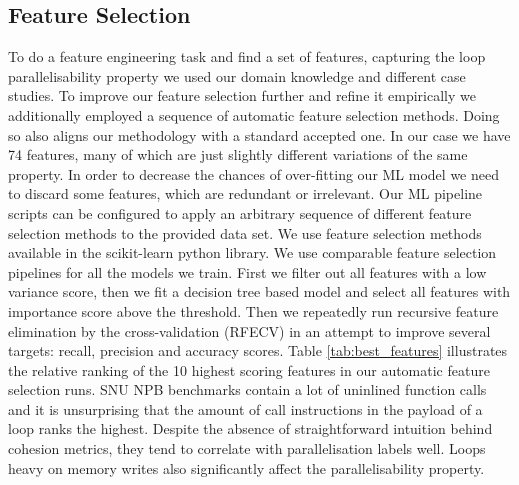 \documentclass[sigconf,10pt,review,anonymous]{acmart}
\begin{document}
\subsection{Feature Selection}
\label{feature_selection}
\quad To do a feature engineering task and find a set of features, capturing the loop parallelisability property we used our domain knowledge and different case studies. To improve our feature selection further and refine it empirically we additionally employed a sequence of automatic feature selection methods. Doing so also aligns our methodology with a standard accepted one.\newline\null
\quad In our case we have 74 features, many of which are just slightly different variations of the same property. In order to decrease the chances of over-fitting our ML model we need to discard some features, which are redundant or irrelevant.\newline\null
\quad Our ML pipeline scripts can be configured to apply an arbitrary sequence of different feature selection methods to the provided data set. We use feature selection methods available in the scikit-learn python library. We use comparable feature selection pipelines for all the models we train. First we filter out all features with a low variance score, then we fit a decision tree based model and select all features with importance score above the threshold. Then we repeatedly run recursive feature elimination by the cross-validation (RFECV) in an attempt to improve several targets: recall, precision and accuracy scores. Table \ref{tab:best_features} illustrates the relative ranking of the 10 highest scoring features in our automatic feature selection runs.\newline\null  
\quad SNU NPB benchmarks contain a lot of uninlined function calls and it is unsurprising that the amount of call instructions in the payload of a loop ranks the highest. Despite the absence of straightforward intuition behind cohesion metrics, they tend to correlate with parallelisation labels well. Loops heavy on memory writes also significantly affect the parallelisability property.
\end{document}
